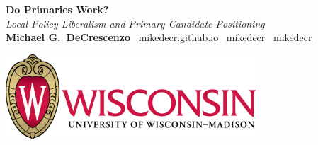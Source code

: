 \documentclass[a0]{a0poster}
\begin{document}


\begin{minipage}[b]{0.6\linewidth}

{\VERYHuge \textsf{\textbf{Do Primaries Work?}}} \\[24pt]
{\veryHuge \emph{Local Policy Liberalism and Primary Candidate Positioning}} \\[24pt]
\Huge \textsf{\textbf{Michael G.\ DeCrescenzo}}
\huge 
$\,$ \faSafari \href{https://mikedecr.github.io}{\sffamily mikedecr.github.io}
$\,$ \faGithub \href{https://github.com/mikedecr}{\sffamily mikedecr}
$\,$ \faTwitter \href{https://twitter.com/mikedecr}{\sffamily mikedecr}

\end{minipage}
%
%
\begin{minipage}[b]{0.33\linewidth}
\raggedleft \includegraphics[width=0.7\textwidth]{graphics/UWlogo.png}
\end{minipage}
\end{document}

